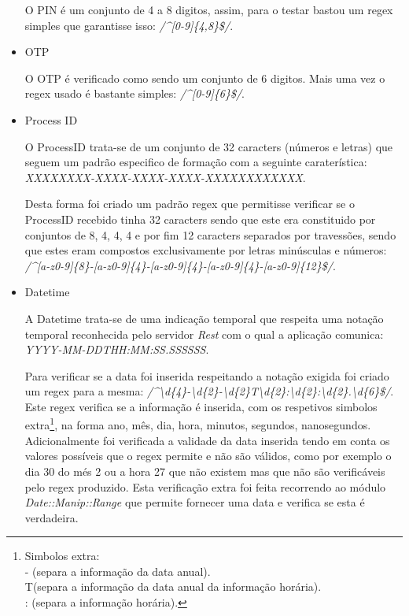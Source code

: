 \begin{itemize}
\par O PIN é um conjunto de 4 a 8 digitos, assim, para o testar bastou um regex simples que garantisse isso: \textit{/\^{}[0-9]\{4,8\}\$/}.

\hfill\newline
\item OTP\newline
\par O OTP é verificado como sendo um conjunto de 6 digitos. Mais uma vez o regex usado é bastante simples: \textit{/\^{}[0-9]\{6\}\$/}.


\hfill\newline
\item Process ID\newline

\par O ProcessID trata-se de um conjunto de 32 caracters (números e letras) que seguem um padrão especifico de formação com a seguinte caraterística: \textit{XXXXXXXX-XXXX-XXXX-XXXX-XXXXXXXXXXXX}.\newline
\par Desta forma foi criado um padrão regex que permitisse verificar se o ProcessID recebido tinha 32 caracters sendo que este era constituido por conjuntos de 8, 4, 4, 4 e por fim 12 caracters separados por travessões, sendo que estes eram compostos exclusivamente por letras minúsculas e números: \textit{/\^{}[a-z0-9]\{8\}-[a-z0-9]\{4\}-[a-z0-9]\{4\}-[a-z0-9]\{4\}-[a-z0-9]\{12\}\$/}.

\hfill\newpage
\item Datetime\newline

\par A Datetime trata-se de uma indicação temporal que respeita uma notação temporal reconhecida pelo servidor \textit{Rest} com o qual a aplicação comunica: \textit{YYYY-MM-DDTHH:MM:SS.SSSSSS}.
\par Para verificar se a data foi inserida respeitando a notação exigida foi criado um regex para a mesma: \textit{/\^{}\textbackslash d\{4\}-\textbackslash d\{2\}-\textbackslash d\{2\}T\textbackslash d\{2\}:\textbackslash d\{2\}:\textbackslash d\{2\}.\textbackslash d\{6\}\$/}. Este regex verifica se a informação é inserida, com os respetivos simbolos extra\footnote{Simbolos extra:\\ - (separa a informação da data anual).\\ T(separa a informação da data anual da informação horária).\\ : (separa a informação horária).}, na forma ano, mês, dia, hora, minutos, segundos, nanosegundos. Adicionalmente foi verificada a validade da data inserida tendo em conta os valores possíveis que o regex permite e não são válidos, como por exemplo o dia 30 do més 2 ou a hora 27 que não existem mas que não são verificáveis pelo regex produzido. Esta verificação extra foi feita recorrendo ao módulo \textit{Date::Manip::Range}\cite{ref_intro3} que permite fornecer uma data e verifica se esta é verdadeira.


\end{itemize}
